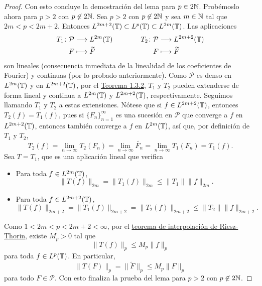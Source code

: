\documentclass[a4paper, 12pt]{book}
\begin{document}
\begin{proof}
    Con esto concluye la demostración del lema para $p \in 2\mathbb N$. Probémoslo ahora para $p > 2$ con $p \not\in 2\mathbb N$. Sea $p>2$ con $p \not\in 2\mathbb N$ y sea $m\in\mathbb N$ tal que $2m < p < 2m+2$. Entonces $L^{2m+2}(\mathbb T) \subset L^p(\mathbb T) \subset L^{2m}(\mathbb T)$. Las aplicaciones
    \[
    \begin{aligned}[t]
        T_{1} \colon \mathcal{P} &\longrightarrow L^{2m}(\mathbb T) \\
        F &\longmapsto \widetilde{F} 
    \end{aligned}
    \qquad \qquad
    \begin{aligned}[t]
        T_{2} \colon \mathcal{P} &\longrightarrow L^{2m+2}(\mathbb T) \\
        F &\longmapsto \widetilde{F} 
    \end{aligned}
    \]
    son lineales (consecuencia inmediata de la linealidad de los coeficientes de Fourier) y continuas (por lo probado anteriormente). Como $\mathcal{P}$ es denso en $L^{2m}(\mathbb T)$ y en $L^{2m+2}(\mathbb T)$, por el \hyperref[1.3.2]{Teorema 1.3.2}, $T_{1}$ y $T_{2}$ pueden extenderse de forma lineal y continua a $L^{2m}(\mathbb T)$ y $L^{2m+2}(\mathbb T)$, respectivamente. Seguimos llamando $T_{1}$ y $T_{2}$ a estas extensiones. Nótese que si $f \in L^{2m+2}(\mathbb T)$, entonces $T_2(f) = T_1(f)$, pues si $\{F_n\}_{n=1}^\infty$ es una sucesión en $\mathcal{P}$ que converge a $f$ en $L^{2m+2}(\mathbb T)$, entonces también converge a $f$ en $L^{2m}(\mathbb T)$, así que, por definición de $T_1$ y $T_2$,
    \[T_2(f)=\lim_{n\to\infty} T_2(F_n) = \lim_{n\to\infty} \widetilde{F_n} =  \lim_{n\to\infty} T_1(F_n) = T_1(f).\] 
    Sea $T = T_{1}$, que es una aplicación lineal que verifica
    \begin{itemize}
        \item Para toda $f \in L^{2m}(\mathbb T)$, \[\|T(f)\|_{2m} = \|T_{1}(f)\|_{2m} \leq \|T_{1}\| \|f\|_{2m}.\]
        \item Para toda $f \in L^{2m+2}(\mathbb T)$, \[\|T(f)\|_{2m+2} = \|T_1(f)\|_{2m+2} = \|T_2(f)\|_{2m+2} \leq \|T_2\|\|f\|_{2m+2}.\]
    \end{itemize}
    Como $1<2m<p<2m+2<\infty$, por el \hyperref[3.2.5]{teorema de interpolación de Riesz-Thorin}, existe $M_p>0$ tal que
    \[\|T(f)\|_p  \leq M_p\|f\|_p\]
    para toda $f \in L^p(\mathbb T)$. En particular,
    \[\|T(F)\|_{p} = \|\widetilde{F}\|_{p} \leq M_p \|F\|_p\]
    para todo $F \in \mathcal{P}$. Con esto finaliza la prueba del lema para $p > 2$ con $p\not\in 2\mathbb N$.
    

\end{proof}
\end{document}
